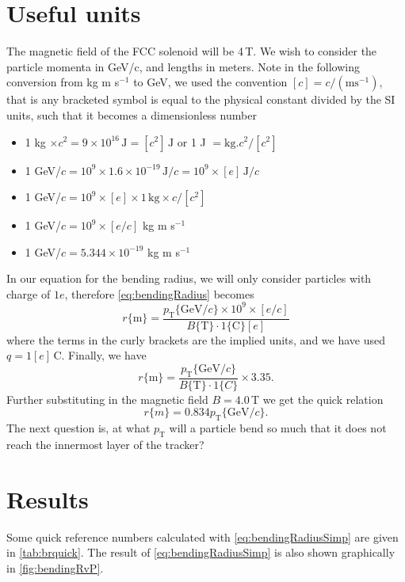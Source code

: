 \documentclass[a4paper, 12pt]{article}
\newcommand{\pt}{\ensuremath{p_{\mathrm{T}}}\xspace}
\begin{document}
\section{Useful units} 
The magnetic field of the FCC solenoid will be 4\,T. 
We wish to consider the particle momenta in GeV/c, and lengths in meters. 
Note in the following conversion from kg m s$^{-1}$ to GeV, we used the convention $[c] = c /(\mathrm{m s}^{-1})$, that is any bracketed symbol is equal to the physical constant divided by the SI
units, such that it becomes a dimensionless number  
\begin{itemize}
  \item 1 kg $\times c^2 = 9 \times 10^{16}\,\mathrm{J} = [c^2]\,\mathrm{J}$ or 1 J $ = \mathrm{kg}.c^2 / [c^2]$
  \item 1 GeV/$c = 10^9 \times 1.6 \times 10^{-19}\,\mathrm{J}/c = 10^9 \times [e] \, \mathrm{J}/c$
  \item 1 GeV/$c = 10^9 \times [e] \times 1 \, \mathrm{kg} \times c / [c^2]$
  \item 1 GeV/$c = 10^9 \times [e/c] $ kg m s$^{-1}$
  \item 1 GeV/$c = 5.344 \times 10^{-19}$ kg m s$^{-1}$
\end{itemize}
In our equation for the bending radius, we will only consider particles with charge of $1e$, therefore
\cref{eq:bendingRadius} becomes
\begin{equation}
  r\{\mathrm{m}\} = \frac{ \pt\{\mathrm{GeV}/c\} \times 10^9 \times [e/c]}{B\{\mathrm{T}\} \cdot 1\{\mathrm{C}\}[e]} 
\end{equation}
where the terms in the curly brackets are the implied units, and we have used $q = 1[e]$\,C. 
Finally, we have
\begin{equation}
  r\{\mathrm{m}\} = \frac{ \pt\{\mathrm{GeV}/c\} }{ B\{\mathrm{T}\} \cdot 1\{C\}} \times 3.35. 
\end{equation}
Further substituting in the magnetic field $B=4.0$\,T we get the quick relation
\begin{equation}
  \boxed{
  r\{m\} = 0.834 \pt \{\mathrm{GeV}/c\}.
}
  \label{eq:bendingRadiusSimp}
\end{equation}
The next question is, at what \pt will a particle bend so much that it does not reach the innermost layer of the tracker?

\section{Results}
Some quick reference numbers calculated with \cref{eq:bendingRadiusSimp} are given in \cref{tab:brquick}. 
The result of \cref{eq:bendingRadiusSimp} is also shown graphically in \cref{fig:bendingRvP}.
\end{document}
